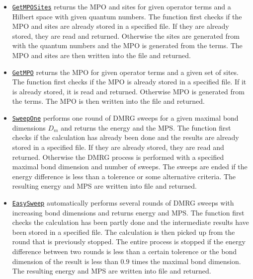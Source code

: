 \documentclass{timesjhep}
\begin{document}
\begin{itemize}
    \item \href{https://docs.fuzzified.world/itensors/\#FuzzifiED.GetMPOSites-Tuple{String,\%20Union{Sum{Scaled{ComplexF64,\%20Prod{Op}}},\%20Vector{Term}},\%20Vector{QNDiag}}}{\lstinline|GetMPOSites|} returns the MPO and sites for given operator terms and a Hilbert space with given quantum numbers. The function first checks if the MPO and sites are already stored in a specified file. If they are already stored, they are read and returned. Otherwise the sites are generated from with the quantum numbers and the MPO is generated from the terms. The MPO and sites are then written into the file and returned. 
    \item \href{https://docs.fuzzified.world/itensors/\#FuzzifiED.GetMPO-Tuple{String,\%20Union{Sum{Scaled{ComplexF64,\%20Prod{Op}}},\%20Vector{Term}},\%20Vector{\%3C:Index}}}{\lstinline|GetMPO|} returns the MPO for given operator terms and a given set of sites. The function first checks if the MPO is already stored in a specified file. If it is already stored, it is read and returned. Otherwise MPO is generated from the terms. The MPO is then written into the file and returned. 
    \item \href{https://docs.fuzzified.world/itensors/\#FuzzifiED.SweepOne-Tuple{String,\%20MPO,\%20MPS,\%20Int64}}{\lstinline|SweepOne|} performs one round of DMRG sweeps for a given maximal bond dimensions $D_m$ and returns the energy and the MPS. The function first checks if the calculation has already been done and the results are already stored in a specified file. If they are already stored, they are read and returned. Otherwise the DMRG process is performed with a specified maximal bond dimension and number of sweeps. The sweeps are ended if the energy difference is less than a tolerence or some alternative criteria. The resulting energy and MPS are written into file and returned.
    \item \href{https://docs.fuzzified.world/itensors/\#FuzzifiED.EasySweep-Tuple{String,\%20MPO,\%20MPS}}{\lstinline|EasySweep|} automatically performs several rounds of DMRG sweeps with increasing bond dimensions and returns energy and MPS. The function first checks the calculation has been partly done and the intermediate results have been stored in a specified file. The calculation is then picked up from the round that is previously stopped. The entire process is stopped if the energy difference between two rounds is less than a certain tolerence or the bond dimension of the result is less than $0.9$ times the maximal bond dimension. The resulting energy and MPS are written into file and returned.
\end{itemize}
\end{document}

